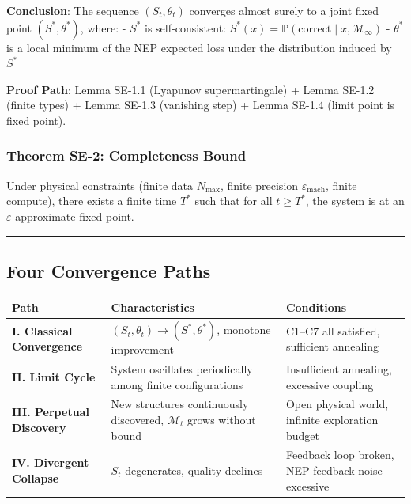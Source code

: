 \documentclass[
  12pt,
]{article}
\begin{document}
\textbf{Conclusion}: The sequence \((S_t, \theta_t)\) converges almost surely to a joint fixed point
\((S^*, \theta^*)\), where:
- \(S^*\) is self-consistent: \(S^*(x) = \mathbb{P}(\text{correct} \mid x, \mathcal{M}_\infty)\)
- \(\theta^*\) is a local minimum of the NEP expected loss under the distribution induced by \(S^*\)

\textbf{Proof Path}: Lemma SE-1.1 (Lyapunov supermartingale) + Lemma SE-1.2
(finite types) + Lemma SE-1.3 (vanishing step) + Lemma SE-1.4 (limit point is fixed point).

\subsubsection{Theorem SE-2: Completeness
Bound}\label{theorem-se-2-completeness-bound}

Under physical constraints (finite data \(N_{\max}\), finite precision
\(\varepsilon_{\text{mach}}\), finite compute), there exists a finite time \(T^*\)
such that for all \(t \geq T^*\), the system is at an \(\varepsilon\)-approximate fixed point.

\begin{center}\rule{0.5\linewidth}{0.5pt}\end{center}

\subsection{Four Convergence Paths}\label{four-convergence-paths}

\begin{longtable}[]{@{}
  >{\raggedright\arraybackslash}p{}
  >{\raggedright\arraybackslash}p{}
  >{\raggedright\arraybackslash}p{}@{}}
\toprule\noalign{}
\begin{minipage}[b]{\linewidth}\raggedright
Path
\end{minipage} & \begin{minipage}[b]{\linewidth}\raggedright
Characteristics
\end{minipage} & \begin{minipage}[b]{\linewidth}\raggedright
Conditions
\end{minipage} \\
\midrule\noalign{}
\endhead
\bottomrule\noalign{}
\endlastfoot
\textbf{I. Classical Convergence} & \((S_t, \theta_t) \to (S^*, \theta^*)\), monotone improvement
& C1--C7 all satisfied, sufficient annealing \\
\textbf{II. Limit Cycle} & System oscillates periodically among finite configurations & Insufficient annealing, excessive coupling \\
\textbf{III. Perpetual Discovery} & New structures continuously discovered, \(\mathcal{M}_t\) grows without bound &
Open physical world, infinite exploration budget \\
\textbf{IV. Divergent Collapse} & \(S_t\) degenerates, quality declines & Feedback loop broken, NEP
feedback noise excessive \\
\end{longtable}
\end{document}
